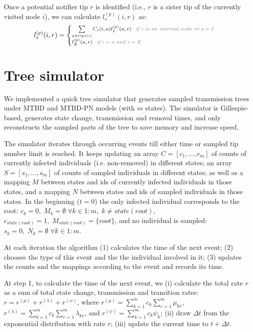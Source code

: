 \documentclass[a4paper,10pt]{article}
\begin{document}
Once a potential notifier tip $r$ is identified (i.e., $r$ is a sister tip of the currently visited node $i$), we can calculate $l_s^{(p)}(i, r)$ as:
\begin{equation}
\scriptsize 
l_s^{(p)}(i, r) = 
\begin{cases}
\sum\limits_{a \in tips(i)}C_s(i, a) l_I^{(p)}(a, r)\textit{\color{gray}~~if $i$ is an internal node or $s=I$}\\
l_E^{(p)}(a, r)\textit{\color{gray}~~if $i=a$ and $s=E$}
\end{cases}
\end{equation}


\section{Tree simulator}
We implemented a quick tree simulator that generates sampled transmission trees under MTBD and MTBD-PN models (with $m$ states). The simulator is Gillespie-based, generates state change, transmission and removal times, and only reconstructs the sampled parts of the tree to save memory and increase speed. 

The simulator iterates through occurring events till either time or sampled tip number limit is reached. 
It keeps updating an array $C = [c_1, \ldots, c_m]$ of counts of currently infected individuals (i.e. non-removed) in different states; an array $S = [s_1, \ldots, s_m]$ of counts of sampled individuals in different states; as well as a mapping $M$ between states and ids of currently infected individuals in those states, and a mapping $N$ between states and ids of sampled individuals in those states.  In the beginning ($t=0$) the only infected individual corresponds to the root: $c_k = 0, \;M_k = \emptyset \; \forall k \in 1:m, \; k \neq state(root)$, $c_{state(root)} = 1, \; M_{state(root)} = \{root\}$, and no individual is sampled: $s_k=0,\;N_k = \emptyset \; \forall k \in 1:m$.

At each iteration the algorithm (1) calculates the time of the next event; (2) chooses the type of this event and the the individual involved in it; (3) updates the counts and the mappings according to the event and records its time.

At step 1, to calculate the time of the next event, we (i) calculate the total rate $r$ as a sum of total state change, transmission and transition rates: $r = r^{(\mu)} + r^{(\lambda)} + r^{(\psi)}$, where $r^{(\mu)} = \sum\limits_{k=1}^{m} c_k \sum\limits_{r=1}^{m} \mu_{kr}$, $r^{(\lambda)} = \sum\limits_{k=1}^{m} c_k \sum\limits_{r=1}^{m} \lambda_{kr}$, and $r^{(\psi)} = \sum\limits_{k=1}^{m} c_k \psi_{k}$; (ii) draw $\Delta t$ from the exponential distribution with rate $r$; (iii) update the current time to $t + \Delta t$.
\end{document}
